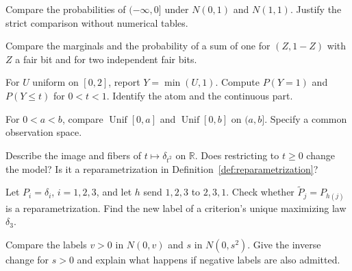 \documentclass[11pt,oneside]{book}
\theoremstyle{definition}
\theoremstyle{remark}
\newcommand{\R}{\mathbb R}
\begin{document}
\begin{practiceexercise}
\label{wex:normal-mean-separation}
Compare the probabilities of $(-\infty,0]$ under $N(0,1)$ and $N(1,1)$.
Justify the strict comparison without numerical tables.
\end{practiceexercise}

\begin{practiceexercise}
\label{wex:same-marginals-fixed-sum}
Compare the marginals and the probability of a sum of one for $(Z,1-Z)$ with
$Z$ a fair bit and for two independent fair bits.
\end{practiceexercise}

\begin{practiceexercise}
\label{wex:saturated-uniform}
For $U$ uniform on $[0,2]$, report $Y=\min(U,1)$. Compute $P(Y=1)$ and
$P(Y\le t)$ for $0<t<1$. Identify the atom and the continuous part.
\end{practiceexercise}

\begin{practiceexercise}
\label{wex:uniform-scale-separation}
For $0<a<b$, compare $\operatorname{Unif}[0,a]$ and
$\operatorname{Unif}[0,b]$ on $(a,b]$. Specify a common observation space.
\end{practiceexercise}

\begin{practiceexercise}
\label{wex:signed-point-label}
Describe the image and fibers of $t\mapsto\delta_{t^2}$ on $\R$. Does
restricting to $t\ge0$ change the model? Is it a reparametrization in
Definition~\ref{def:reparametrization}?
\end{practiceexercise}

\begin{practiceexercise}
\label{wex:integer-label-reorder}
Let $P_i=\delta_i$, $i=1,2,3$, and let $h$ send $1,2,3$ to $2,3,1$. Check
whether $\widetilde P_j=P_{h(j)}$ is a reparametrization. Find the new label
of a criterion's unique maximizing law $\delta_3$.
\end{practiceexercise}

\begin{practiceexercise}
\label{wex:normal-scale-label}
Compare the labels $v>0$ in $N(0,v)$ and $s$ in $N(0,s^2)$. Give the inverse
change for $s>0$ and explain what happens if negative labels are also
admitted.
\end{practiceexercise}
\end{document}
